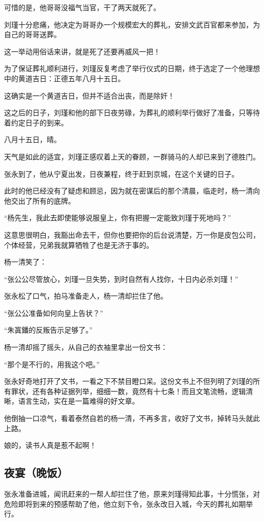 \begin{multicols}{\theparacolNo}
		可惜的是，他哥哥没福气当官，干了两天就死了。

		刘瑾十分悲痛，他决定为哥哥办一个规模宏大的葬礼，安排文武百官都来参加，为自己的哥哥送葬。

		这一举动用俗话来讲，就是死了还要再威风一把！

		为了保证葬礼顺利进行，刘瑾反复考虑了举行仪式的日期，终于选定了一个他理想中的黄道吉日：正德五年八月十五日。

		这确实是一个黄道吉日，但并不适合出丧，而是除奸！

		这之后的日子，刘瑾和他的部下日夜劳碌，为葬礼的顺利举行做好了准备，只等待着约定日子的到来。

		八月十五日，晴。

		天气是如此的适宜，刘瑾正感叹着上天的眷顾，一群骑马的人却已来到了德胜门。

		张永到了，他从宁夏出发，日夜兼程，终于赶到京城，在这个关键的日子。

		此时的他已经没有了疑虑和顾忌，因为就在密谋后的那个清晨，临走时，杨一清向他交出了所有的底牌。

		“杨先生，我此去即使能够说服皇上，你有把握一定能致刘瑾于死地吗？”

		这意思很明白，我豁出命去干，但你也要把你的后台说清楚，万一你是皮包公司，个体经营，兄弟我就算牺牲了也是无济于事的。

		杨一清笑了：

		“张公公尽管放心，刘瑾一旦失势，到时自然有人找你，十日内必杀刘瑾！”

		张永松了口气，拍马准备走人，杨一清却拦住了他。

		“张公公准备如何向皇上告状？”

		“朱寘鐇的反叛告示足够了。”

		杨一清却摇了摇头，从自己的衣袖里拿出一份文书：

		“那个是不行的，用我这个吧。”

		张永好奇地打开了文书，一看之下不禁目瞪口呆。这份文书上不但列明了刘瑾的所有罪状，还有各种证据列举，细细一数，竟然有十七条！而且文笔流畅，逻辑清晰，语言生动，实在是一篇难得的好文章。

		他倒抽一口凉气，看着泰然自若的杨一清，不再多言，收好了文书，掉转马头就此上路。

		娘的，读书人真是惹不起啊！

		\subsection{夜宴（晚饭）}
		张永准备进城，闻讯赶来的一帮人却拦住了他，原来刘瑾得知此事，十分慌张，对危险即将到来的预感帮助了他，他立刻下令，张永改日入城，今天的葬礼如期举行。


\end{multicols}
